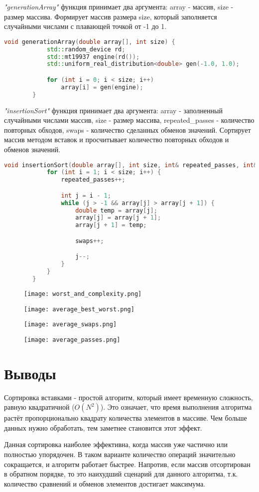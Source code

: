 \documentclass[12pt, a4paper]{report}
\begin{document}
	\textit{"generationArray"} функция принимает два аргумента: array - массив, size - размер массива. Формирует массив размера size, который заполняется случайными числами с плавающей точкой от -1 до 1.
	\lstset{style=mystyle}
	\begin{lstlisting}[language=C++]
		void generationArray(double array[], int size) {
			std::random_device rd;
			std::mt19937 engine(rd());
			std::uniform_real_distribution<double> gen(-1.0, 1.0);

			for (int i = 0; i < size; i++)
				array[i] = gen(engine);
		}		
	\end{lstlisting}

	\textit{"insertionSort"} функция принимает два аргумента: array - заполненный случайными числами массив, size - размер массива, repeated\_passes - количество повторных обходов, swaps - количество сделанных обменов значений. Сортирует массив методом вставок и просчитывает количество повторных обходов и обменов значений.
	\lstset{style=mystyle}
	\begin{lstlisting}[language=C++]
		void insertionSort(double array[], int size, int& repeated_passes, int& swaps) {
			for (int i = 1; i < size; i++) {
				repeated_passes++;

				int j = i - 1;
				while (j > -1 && array[j] > array[j + 1]) {
					double temp = array[j];
					array[j] = array[j + 1];
					array[j + 1] = temp;

					swaps++;

					j--;
				}
			}
		}
	\end{lstlisting}

	\newpage
	\vfill

	\begin{figure}
		\texttt{[image: worst\_and\_complexity.png]}
	\end{figure}
	\begin{figure}
		\texttt{[image: average\_best\_worst.png]}
	\end{figure}
	\begin{figure}
		\texttt{[image: average\_swaps.png]}
	\end{figure}
	\begin{figure}
		\texttt{[image: average\_passes.png]}
	\end{figure}

	\vfill
	\clearpage

	\section*{Выводы}
	Сортировка вставками - простой алгоритм, который имеет временную сложность, равную квадратичной (\( O(N^2) \)). Это означает, что время выполнения алгоритма растёт пропорционально квадрату количества элементов в массиве. Чем больше данных нужно обработать, тем заметнее становится этот эффект. \par
	Данная сортировка наиболее эффективна, когда массив уже частично или полностью упорядочен. В таком варианте количество операций значительно сокращается, и алгоритм работает быстрее. Напротив, если массив отсортирован в обратном порядке, то это наихудший сценарий для данного алгоритма, т.к. количество сравнений и обменов элементов достигает максимума.
\end{document}
